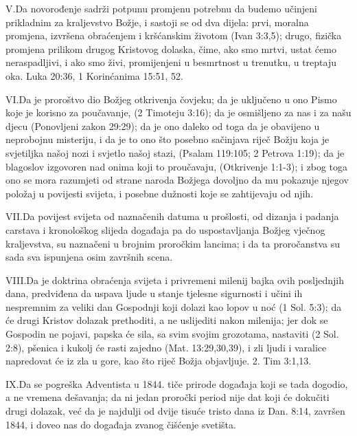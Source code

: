 \lettrine{V.} Da novorođenje sadrži potpunu promjenu potrebnu da budemo učinjeni prikladnim za kraljevstvo Božje, i sastoji se od dva dijela: prvi, moralna promjena, izvršena obraćenjem i kršćanskim životom (Ivan 3:3,5); drugo, fizička promjena prilikom drugog Kristovog dolaska, čime, ako smo mrtvi, ustat ćemo neraspadljivi, i ako smo živi, promijenjeni u besmrtnost u trenutku, u treptaju oka. Luka 20:36, 1 Korinćanima 15:51, 52.

\lettrine{VI.} Da je proroštvo dio Božjeg otkrivenja čovjeku; da je uključeno u ono Pismo koje je korisno za poučavanje, (2 Timoteju 3:16); da je osmišljeno za nas i za našu djecu (Ponovljeni zakon 29:29); da je ono daleko od toga da je obavijeno u neprobojnu misteriju, i da je to ono što posebno sačinjava riječ Božju koja je svjetiljka našoj nozi i svjetlo našoj stazi, (Psalam 119:105; 2 Petrova 1:19); da je blagoslov izgovoren nad onima koji to proučavaju, (Otkrivenje 1:1-3); i zbog toga ono se mora razumjeti od strane naroda Božjega dovoljno da mu pokazuje njegov položaj u povijesti svijeta, i posebne dužnosti koje se zahtijevaju od njih.

\lettrine{VII.} Da povijest svijeta od naznačenih datuma u prošlosti, od dizanja i padanja carstava i kronološkog slijeda događaja pa do uspostavljanja Božjeg vječnog kraljevstva, su naznačeni u brojnim proročkim lancima; i da ta proročanstva su sada sva ispunjena osim završnih scena.

\lettrine{VIII.} Da je doktrina obraćenja svijeta i privremeni milenij bajka ovih posljednjih dana, predviđena da uspava ljude u stanje tjelesne sigurnosti i učini ih nespremnim za veliki dan Gospodnji koji dolazi kao lopov u noć (1 Sol. 5:3); da će drugi Kristov dolazak prethoditi, a ne uslijediti nakon milenija; jer dok se Gospodin ne pojavi, papska će sila, sa svim svojim grozotama, nastaviti (2 Sol. 2:8), pšenica i kukolj će rasti zajedno (Mat. 13:29,30,39), i zli ljudi i varalice napredovat će iz zla u gore, kao što riječ Božja objavljuje. 2. Tim 3:1,13.

\lettrine{IX.} Da se pogreška Adventista u 1844. tiče prirode događaja koji se tada dogodio, a ne vremena dešavanja; da ni jedan proročki period nije dat koji će dokučiti drugi dolazak, već da je najdulji od dvije tisuće tristo dana iz Dan. 8:14, završen 1844, i doveo nas do događaja zvanog čišćenje svetišta.

